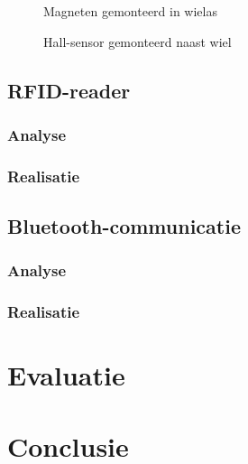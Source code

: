 \documentclass[11pt,a4paper]{report}
\begin{document}
\begin{figure}[H]
	\centering
	\begin{minipage}[b]{0.4\textwidth}
		\centering
		\caption{Magneten gemonteerd in wielas\label{fig:wielmagneten}}
	\end{minipage}
	\hfill
	\begin{minipage}[b]{0.4\textwidth}
		\centering
		\caption{Hall-sensor gemonteerd naast wiel\label{fig:hallsensor}}
	\end{minipage}
\end{figure}


\section{RFID-reader}
\subsection{Analyse}
\subsection{Realisatie}
\section{Bluetooth-communicatie}
\subsection{Analyse}
\subsection{Realisatie}
\chapter{Evaluatie}
\chapter{Conclusie}



\end{document}
